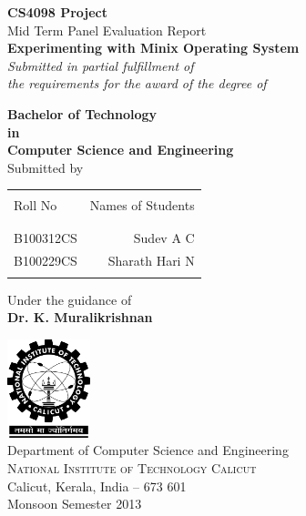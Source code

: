 \begin{titlepage}

\begin{center}

\textup{\small {\bf CS4098 Project} \\ Mid Term Panel Evaluation Report}\\[0.2in]

\Large \textbf {Experimenting with Minix Operating System}\\[0.5in]

       \small \emph{Submitted in partial fulfillment of\\
        the requirements for the award of the degree of}
        \vspace{.2in}

       {\bf Bachelor of Technology \\in\\ Computer Science and Engineering}\\[0.5in]

\normalsize Submitted by \\
\begin{table}[h]
\centering
\begin{tabular}{lr}\hline \\
Roll No & Names of Students \\ \\ \hline
\\
B100312CS & Sudev A C \\
B100229CS & Sharath Hari N \\ 
 \\ \hline 
\end{tabular}
\end{table}

\vspace{.1in}
Under the guidance of\\
{\textbf{Dr. K. Muralikrishnan}}\\[0.2in]

\vfill

\includegraphics[width=0.18\textwidth]{./nitc-logo}\\[0.1in]
\Large{Department of Computer Science and Engineering}\\
\normalsize
\textsc{National Institute of Technology Calicut}\\
Calicut, Kerala, India -- 673 601 \\
\vspace{0.2cm}
Monsoon Semester 2013

\end{center}

\end{titlepage}
